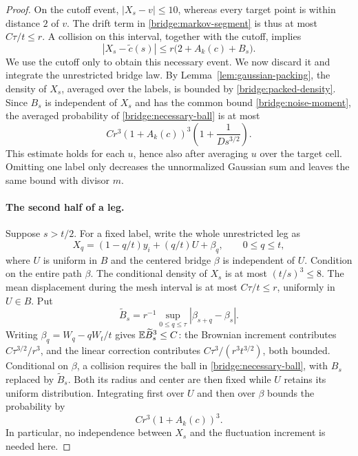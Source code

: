 \begin{proof}
On the cutoff event, $|X_s-v|\le10$, whereas every target point is within
distance $2$ of $v$.  The drift term in
\eqref{bridge:markov-segment} is thus at most $C\tau/t\le r$.
A collision on this interval, together with the cutoff, implies
\begin{equation}\label{bridge:necessary-ball}
 |X_s-\widetilde c(s)|
 \le r\bigl(2+A_k(c)+B_s\bigr).
\end{equation}
We use the cutoff only to obtain this necessary event.  We now discard
it and integrate the unrestricted bridge law.  By
Lemma~\ref{lem:gaussian-packing}, the density of $X_s$, averaged over
the labels, is bounded by \eqref{bridge:packed-density}.  Since $B_s$
is independent of $X_s$ and has the common bound
\eqref{bridge:noise-moment}, the averaged probability of
\eqref{bridge:necessary-ball} is at most
\begin{equation}\label{bridge:early-step}
 Cr^3(1+A_k(c))^3
 \left(1+\frac{1}{Ds^{3/2}}\right).
\end{equation}
This estimate holds for each $u$, hence also after averaging $u$ over
the target cell.  Omitting one label only decreases the unnormalized
Gaussian sum and leaves the same bound with divisor $m$.

\paragraph{The second half of a leg.}
Suppose $s>t/2$.  For a fixed label, write the whole unrestricted leg as
\[
 X_q=(1-q/t)y_i+(q/t)U+\beta_q,\qquad 0\le q\le t,
\]
where $U$ is uniform in $B$ and the centered bridge $\beta$ is
independent of $U$.  Condition on the entire path $\beta$.  The
conditional density of $X_s$ is at most $(t/s)^3\le8$.
The mean displacement during the mesh interval is at most
$C\tau/t\le r$, uniformly in $U\in B$.  Put
\[
 \widetilde B_s=
 r^{-1}\sup_{0\le q\le\tau}|\beta_{s+q}-\beta_s|.
\]
Writing $\beta_q=W_q-qW_t/t$ gives
$\mathbb E\widetilde B_s^3\le C$: the Brownian increment contributes
$C\tau^{3/2}/r^3$, and the linear correction contributes
$C\tau^3/(r^3t^{3/2})$, both bounded.  Conditional on $\beta$, a
collision requires the ball in \eqref{bridge:necessary-ball}, with
$B_s$ replaced by $\widetilde B_s$.  Both its radius and center are then
fixed while $U$ retains its uniform distribution.  Integrating first
over $U$ and then over $\beta$ bounds the probability by
\begin{equation}\label{bridge:late-step}
 Cr^3(1+A_k(c))^3.
\end{equation}
In particular, no independence between $X_s$ and the fluctuation
increment is needed here.


\end{proof}
